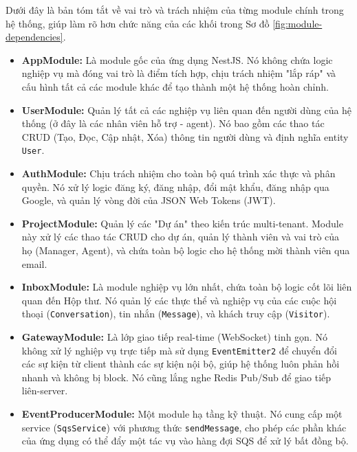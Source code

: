 Dưới đây là bản tóm tắt về vai trò và trách nhiệm của từng module chính trong hệ thống, giúp làm rõ hơn chức năng của các khối trong Sơ đồ \ref{fig:module-dependencies}.

\begin{itemize}
    \item \textbf{AppModule:} Là module gốc của ứng dụng NestJS. Nó không chứa logic nghiệp vụ mà đóng vai trò là điểm tích hợp, chịu trách nhiệm "lắp ráp" và cấu hình tất cả các module khác để tạo thành một hệ thống hoàn chỉnh.

    \item \textbf{UserModule:} Quản lý tất cả các nghiệp vụ liên quan đến người dùng của hệ thống (ở đây là các nhân viên hỗ trợ - agent). Nó bao gồm các thao tác CRUD (Tạo, Đọc, Cập nhật, Xóa) thông tin người dùng và định nghĩa entity \texttt{User}.
    
    \item \textbf{AuthModule:} Chịu trách nhiệm cho toàn bộ quá trình xác thực và phân quyền. Nó xử lý logic đăng ký, đăng nhập, đổi mật khẩu, đăng nhập qua Google, và quản lý vòng đời của JSON Web Tokens (JWT).

    \item \textbf{ProjectModule:} Quản lý các "Dự án" theo kiến trúc multi-tenant. Module này xử lý các thao tác CRUD cho dự án, quản lý thành viên và vai trò của họ (Manager, Agent), và chứa toàn bộ logic cho hệ thống mời thành viên qua email.
    
    \item \textbf{InboxModule:} Là module nghiệp vụ lớn nhất, chứa toàn bộ logic cốt lõi liên quan đến Hộp thư. Nó quản lý các thực thể và nghiệp vụ của các cuộc hội thoại (\texttt{Conversation}), tin nhắn (\texttt{Message}), và khách truy cập (\texttt{Visitor}).
    
    \item \textbf{GatewayModule:} Là lớp giao tiếp real-time (WebSocket) tinh gọn. Nó không xử lý nghiệp vụ trực tiếp mà sử dụng \texttt{EventEmitter2} để chuyển đổi các sự kiện từ client thành các sự kiện nội bộ, giúp hệ thống luôn phản hồi nhanh và không bị block. Nó cũng lắng nghe Redis Pub/Sub để giao tiếp liên-server.

    \item \textbf{EventProducerModule:} Một module hạ tầng kỹ thuật. Nó cung cấp một service (\texttt{SqsService}) với phương thức \texttt{sendMessage}, cho phép các phần khác của ứng dụng có thể đẩy một tác vụ vào hàng đợi SQS để xử lý bất đồng bộ.
    

\end{itemize}

